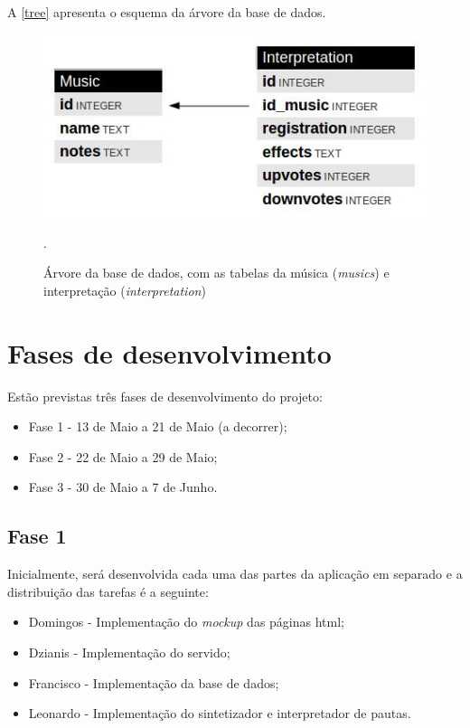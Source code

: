 \documentclass{report}
\begin{document}
A \autoref{tree} apresenta o esquema da árvore da base de dados.

\begin{figure}[htp]
\centering
\includegraphics[width=\textwidth]{images/tree.jpg}
\caption{Árvore da base de dados, com as tabelas da música (\emph{musics}) e interpretação (\emph{interpretation})}.
\label{tree}
\end{figure}

\chapter{Fases de desenvolvimento}
\label{chap.fases}
Estão previstas três fases de desenvolvimento do projeto:

\begin{itemize}
\item Fase 1 - 13 de Maio a 21 de Maio (a decorrer);
\item Fase 2 - 22 de Maio a 29 de Maio;
\item Fase 3 - 30 de Maio a 7 de Junho.
\end{itemize}

\section{Fase 1}
Inicialmente, será desenvolvida cada uma das partes da aplicação em separado e a distribuição das tarefas é a seguinte:
\begin{itemize}
\item Domingos - Implementação do \textit{mockup} das páginas \ac{html};
\item Dzianis - Implementação do servido;
\item Francisco - Implementação da base de dados;
\item Leonardo - Implementação do sintetizador e interpretador de pautas.
\end{itemize}
\end{document}
